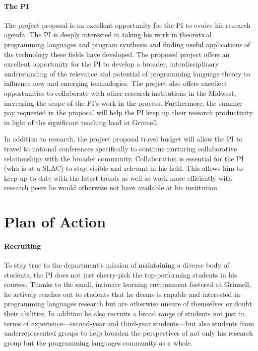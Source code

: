\documentclass[11pt]{article}
\begin{document}
\paragraph{The PI}
The project proposal is an excellent opportunity for the PI to evolve his research agenda.
The PI is deeply interested in taking his work in theoretical programming languages and program synthesis and finding useful applications of the technology these fields have developed.
The proposed project offers an excellent opportunity for the PI to develop a broader, interdisciplinary understanding of the relevance and potential of programming language theory to influence new and emerging technologies.
The project also offers excellent opportunities to collaborate with other research institutions in the Midwest, increasing the scope of the PI's work in the process.
Furthermore, the summer pay requested in the proposal will help the PI keep up their research productivity in light of the significant teaching load at Grinnell.

In addition to research, the project proposal travel budget will allow the PI to travel to national conferences specifically to continue nurturing collaborative relationships with the broader community.
Collaboration is essential for the PI (who is at a SLAC) to stay visible and relevant in his field.
This allows him to keep up to date with the latest trends as well as work more efficiently with research peers he would otherwise not have available at his institution.

\section{Plan of Action}

\paragraph{Recruiting}

To stay true to the department's mission of maintaining a diverse body of students, the PI does not just cherry-pick the top-performing students in his courses.
Thanks to the small, intimate learning environment fostered at Grinnell, he actively reaches out to students that he deems is capable and interested in programming languages research but are otherwise unsure of themselves or doubt their abilities.
In addition he also recruits a broad range of students not just in terms of experience---second-year and third-year students---but also students from underrepresented groups to help broaden the perspectives of not only his research group but the programming languages community as a whole.
\end{document}

